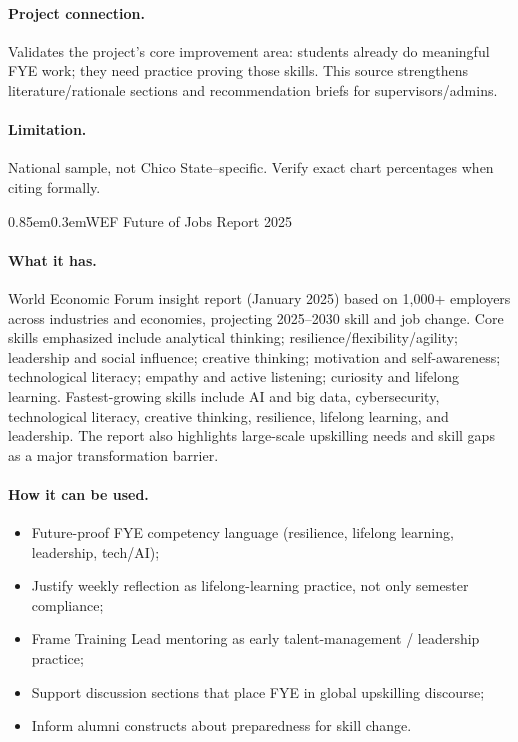 \documentclass[11pt,letterpaper]{article}
\makeatletter
\renewcommand\subsection{\@startsection{subsection}{2}{\z@}%
  {0.85em}{0.3em}{\normalsize\bfseries}}
\makeatother
\begin{document}
\paragraph{Project connection.}
Validates the project's core improvement area: students already do meaningful FYE work; they need practice proving those skills. This source strengthens literature/rationale sections and recommendation briefs for supervisors/admins.

\paragraph{Limitation.}
National sample, not Chico State--specific. Verify exact chart percentages when citing formally.

\subsection{WEF Future of Jobs Report 2025}
\paragraph{What it has.}
World Economic Forum insight report (January 2025) based on 1,000+ employers across industries and economies, projecting 2025--2030 skill and job change. Core skills emphasized include analytical thinking; resilience/flexibility/agility; leadership and social influence; creative thinking; motivation and self-awareness; technological literacy; empathy and active listening; curiosity and lifelong learning. Fastest-growing skills include AI and big data, cybersecurity, technological literacy, creative thinking, resilience, lifelong learning, and leadership. The report also highlights large-scale upskilling needs and skill gaps as a major transformation barrier.

\paragraph{How it can be used.}
\begin{itemize}
  \item Future-proof FYE competency language (resilience, lifelong learning, leadership, tech/AI);
  \item Justify weekly reflection as lifelong-learning practice, not only semester compliance;
  \item Frame Training Lead mentoring as early talent-management / leadership practice;
  \item Support discussion sections that place FYE in global upskilling discourse;
  \item Inform alumni constructs about preparedness for skill change.
\end{itemize}
\end{document}
